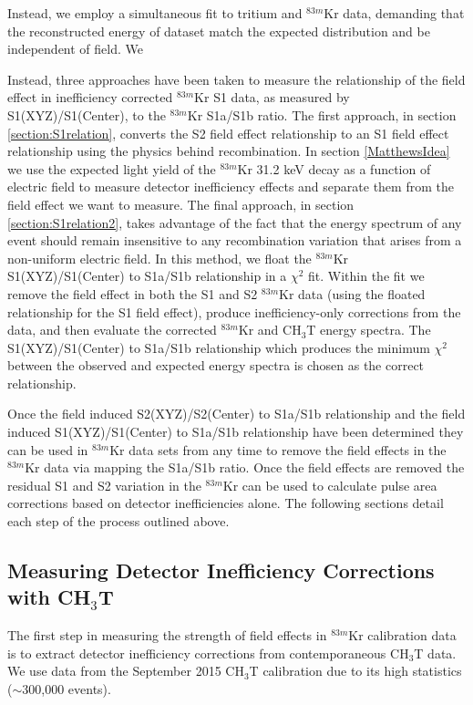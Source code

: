 Instead, we employ a simultaneous fit to tritium and  $^{83m}$Kr data, demanding that the reconstructed energy of 
dataset match the expected distribution and be independent of field. We


Instead, three approaches have been taken to measure the relationship of the field effect in inefficiency corrected $^{83m}$Kr S1 data, as measured by S1(XYZ)/S1(Center), to the $^{83m}$Kr S1a/S1b ratio.  The first approach, in section \ref{section:S1relation}, converts the S2 field effect relationship to an S1 field effect relationship using the physics behind recombination.  In section \ref{MatthewsIdea} we use the expected light yield of the $^{83m}$Kr 31.2 keV decay as a function of electric field to measure detector inefficiency effects and separate them from the field effect we want to measure.  The final approach, in section \ref{section:S1relation2}, takes advantage of the fact that the energy spectrum of any event should remain insensitive to any recombination variation that arises from a non-uniform electric field.  In this method, we float the $^{83m}$Kr S1(XYZ)/S1(Center) to S1a/S1b relationship in a $\chi^2$ fit.  Within the fit we remove the field effect in both the S1 and S2 $^{83m}$Kr data (using the floated relationship for the S1 field effect), produce inefficiency-only corrections from the data, and then evaluate the corrected $^{83m}$Kr and CH$_3$T energy spectra.  The  S1(XYZ)/S1(Center) to S1a/S1b relationship which produces the minimum $\chi^2$ between the observed and expected energy spectra is chosen as the correct relationship.

Once the field induced S2(XYZ)/S2(Center) to S1a/S1b relationship and the field induced S1(XYZ)/S1(Center) to S1a/S1b relationship have been determined they can be used in $^{83m}$Kr data sets from any time to remove the field effects in the $^{83m}$Kr data via mapping the S1a/S1b ratio.  Once the field effects are removed the residual S1 and S2 variation in the $^{83m}$Kr can be used to calculate pulse area corrections based on detector inefficiencies alone. The following sections detail each step of the process outlined above.

\subsection{Measuring Detector Inefficiency Corrections with CH$_3$T}

The first step in measuring the strength of field effects in $^{83m}$Kr calibration data is to extract detector inefficiency corrections from contemporaneous CH$_3$T data.  We use data from the September 2015 CH$_3$T calibration due to its high statistics ($\sim$300,000 events). 

